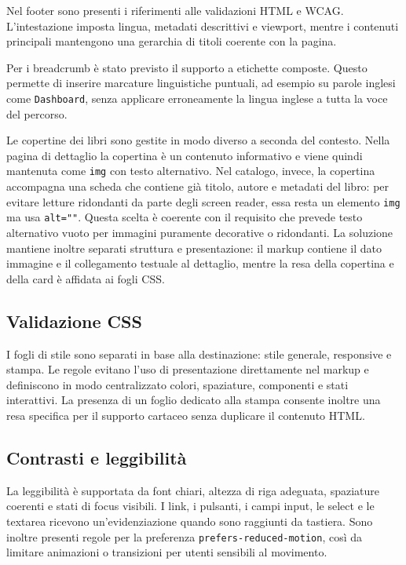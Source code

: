 ﻿\documentclass{article}
\begin{document}
Nel footer sono presenti i riferimenti alle validazioni HTML e WCAG. L'intestazione imposta lingua, metadati descrittivi e viewport, mentre i contenuti principali mantengono una gerarchia di titoli coerente con la pagina.

Per i breadcrumb è stato previsto il supporto a etichette composte. Questo permette di inserire marcature linguistiche puntuali, ad esempio su parole inglesi come \texttt{Dashboard}, senza applicare erroneamente la lingua inglese a tutta la voce del percorso.

Le copertine dei libri sono gestite in modo diverso a seconda del contesto. Nella pagina di dettaglio la copertina è un contenuto informativo e viene quindi mantenuta come \texttt{img} con testo alternativo. Nel catalogo, invece, la copertina accompagna una scheda che contiene già titolo, autore e metadati del libro: per evitare letture ridondanti da parte degli screen reader, essa resta un elemento \texttt{img} ma usa \texttt{alt=""}. Questa scelta è coerente con il requisito che prevede testo alternativo vuoto per immagini puramente decorative o ridondanti. La soluzione mantiene inoltre separati struttura e presentazione: il markup contiene il dato immagine e il collegamento testuale al dettaglio, mentre la resa della copertina e della card è affidata ai fogli CSS.

\subsection{Validazione CSS}
I fogli di stile sono separati in base alla destinazione: stile generale, responsive e stampa. Le regole evitano l'uso di presentazione direttamente nel markup e definiscono in modo centralizzato colori, spaziature, componenti e stati interattivi. La presenza di un foglio dedicato alla stampa consente inoltre una resa specifica per il supporto cartaceo senza duplicare il contenuto HTML.

\subsection{Contrasti e leggibilità}
La leggibilità è supportata da font chiari, altezza di riga adeguata, spaziature coerenti e stati di focus visibili. I link, i pulsanti, i campi input, le select e le textarea ricevono un'evidenziazione quando sono raggiunti da tastiera. Sono inoltre presenti regole per la preferenza \texttt{prefers-reduced-motion}, così da limitare animazioni o transizioni per utenti sensibili al movimento.
\end{document}
